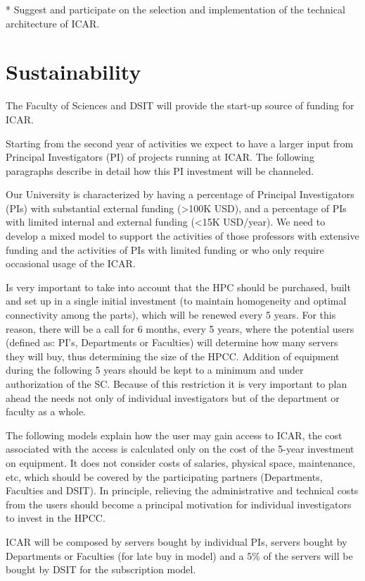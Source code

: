 \documentclass{article}
\begin{document}
* Suggest and participate on the selection and implementation of the technical architecture of ICAR.

\section{Sustainability}

The Faculty of Sciences and DSIT will provide the start-up source of funding for ICAR.

Starting from the second year of activities we expect to have a larger input from Principal Investigators (PI) of projects running at ICAR. The following paragraphs describe in detail how this PI investment will be channeled.

Our University is characterized by having a percentage of Principal Investigators (PIs) with substantial external funding (>100K USD), and a percentage of PIs with limited internal and external funding (<15K USD/year). We need to develop a mixed model to support the activities of those professors with extensive funding and the activities of PIs with limited funding or who only require occasional usage of the ICAR.

Is very important to take into account that the HPC should be purchased, built and set up in a single initial investment (to maintain homogeneity and optimal connectivity among the parts), which will be renewed every 5 years. For this reason, there will be a call for 6 months, every 5 years, where the potential users (defined as: PI’s, Departments or Faculties) will determine how many servers they will buy, thus determining the size of the HPCC. Addition of equipment during the following 5 years should be kept to a minimum and under authorization of the SC. Because of this restriction it is very important to plan ahead the needs not only of individual investigators but of the department or faculty as a whole.

The following models explain how the user may gain access to ICAR, the cost associated with the access is calculated only on the cost of the 5-year investment on equipment. It does not consider costs of salaries, physical space, maintenance, etc, which should be covered by the participating partners (Departments, Faculties and DSIT). In principle, relieving the administrative and technical costs from the users should become a principal motivation for individual investigators to invest in the HPCC.

ICAR will be composed by servers bought by individual PIs, servers bought by Departments or Faculties (for late buy in model) and a 5\% of the servers will be bought by DSIT for the subscription model.
\end{document}
